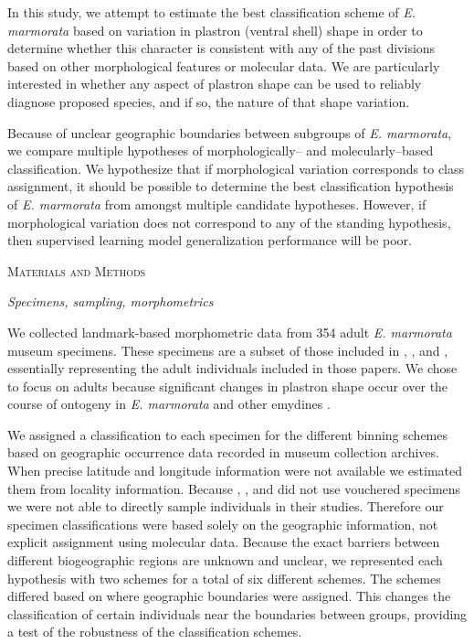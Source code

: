 \documentclass[12pt,letterpaper]{article}
\renewcommand{\section}[1]{%
\bigskip
\begin{center}
\begin{Large}
\normalfont\scshape #1
\medskip
\end{Large}
\end{center}}
\renewcommand{\subsection}[1]{%
\bigskip
\begin{center}
\begin{large}
\normalfont\itshape #1
\end{large}
\end{center}}
\begin{document}
In this study, we attempt to estimate the best classification scheme of \textit{E. marmorata} based on variation in plastron (ventral shell) shape in order to determine whether this character is consistent with any of the past divisions based on other morphological features or molecular data. We are particularly interested in whether any aspect of plastron shape can be used to reliably diagnose \citet{Spinks2014} proposed species, and if so, the nature of that shape variation.

Because of unclear geographic boundaries between subgroups of \textit{E. marmorata}, we compare multiple hypotheses of morphologically-- and molecularly--based classification. We hypothesize that if morphological variation corresponds to class assignment, it should be possible to determine the best classification hypothesis of \textit{E. marmorata} from amongst multiple candidate hypotheses. However, if morphological variation does not correspond to any of the standing hypothesis, then supervised learning model generalization performance will be poor.


\section{Materials and Methods}
\subsection{Specimens, sampling, morphometrics}
We collected landmark-based morphometric data from 354 adult \textit{E. marmorata} museum specimens. These specimens are a subset of those included in \citet{Angielczyk2007}, \citet{Angielczyk2011}, and \citet{Angielczyk2013a}, essentially representing the adult individuals included in those papers. We chose to focus on adults because significant changes in plastron shape occur over the course of ontogeny in \textit{E. marmorata} and other emydines \citep{Angielczyk2013a}.

We assigned a classification to each specimen for the different binning schemes based on geographic occurrence data recorded in museum collection archives. When precise latitude and longitude information were not available we estimated them from locality information. Because \citet{Spinks2005}, \citet{Spinks2010}, and \citet{Spinks2014} did not use vouchered specimens we were not able to directly sample individuals in their studies. Therefore our specimen classifications were based solely on the geographic information, not explicit assignment using molecular data. Because the exact barriers between different biogeographic regions are unknown and unclear, we represented each hypothesis with two schemes for a total of six different schemes. The schemes differed based on where geographic boundaries were assigned. This changes the classification of certain individuals near the boundaries between groups, providing a test of the robustness of the classification schemes.
\end{document}
